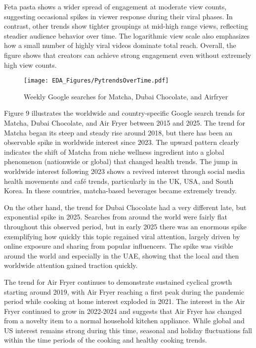 \documentclass{article}
\begin{document}
Feta pasta shows a wider spread of engagement at moderate view counts, suggesting occasional spikes in viewer response during their viral phases. In contrast, other trends show tighter groupings at mid-high range views, reflecting steadier audience behavior over time. The logarithmic view scale also emphasizes how a small number of highly viral videos dominate total reach. Overall, the figure shows that creators can achieve strong engagement even without extremely high view counts. 

\begin{figure}[H]
    \centering
    \texttt{[image: EDA\_Figures/PytrendsOverTime.pdf]}
    \caption{Weekly Google searches for Matcha, Dubai Chocolate, and Airfryer}
    \label{fig:engagement_views}
\end{figure}

Figure 9 illustrates the worldwide and country-specific Google search trends for Matcha, Dubai Chocolate, and Air Fryer between 2015 and 2025. 
The trend for Matcha began its steep and steady rise around 2018, but there has been an observable spike in worldwide interest since 2023. The upward pattern clearly indicates the shift of Matcha from niche wellness ingredient into a global phenomenon (nationwide or global) that changed health trends. The jump in worldwide interest following 2023 shows a revived interest through social media health movements and café trends, particularly in the UK, USA, and South Korea. In these countries, matcha-based beverages became extremely trendy. 

On the other hand, the trend for Dubai Chocolate had a very different late, but exponential spike in 2025. Searches from around the world were fairly flat throughout this observed period, but in early 2025 there was an enormous spike exemplifying how quickly this topic regained viral attention, largely driven by online exposure and sharing from popular influencers. The spike was visible around the world and especially in the UAE, showing that the local and then worldwide attention gained traction quickly.

The trend for Air Fryer continues to demonstrate sustained cyclical growth starting around 2019, with Air Fryer reaching a first peak during the pandemic period while cooking at home interest exploded in 2021. The interest in the Air Fryer continued to grow in 2022-2024 and suggests that Air Fryer has changed from a novelty item to a normal household kitchen appliance. While global and US interest remains strong during this time, seasonal and holiday fluctuations fall within the time periods of the cooking and healthy cooking trends.
\end{document}
